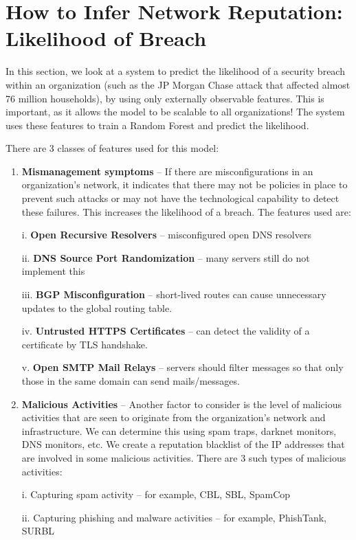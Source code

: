 \documentclass[11pt]{article}
\begin{document}
\section{How to Infer Network Reputation: Likelihood of Breach}
\label{sec:orgbd70231}

In this section, we look at a system to predict the likelihood of a security breach within an organization (such as the JP Morgan Chase attack that affected almost 76 million households), by using only externally observable features. This is important, as it allows the model to be scalable to all organizations! The system uses these features to train a Random Forest and predict the likelihood.

There are 3 classes of features used for this model:

\begin{enumerate}
\item \textbf{Mismanagement symptoms} – If there are misconfigurations in an organization’s network, it indicates that there may not be policies in place to prevent such attacks or may not have the technological capability to detect these failures. This increases the likelihood of a breach. The features used are:

i. \textbf{Open Recursive Resolvers} – misconfigured open DNS resolvers

ii. \textbf{DNS Source Port Randomization} – many servers still do not implement this

iii. \textbf{BGP Misconfiguration} – short-lived routes can cause unnecessary updates to the global routing table.

iv. \textbf{Untrusted HTTPS Certificates} – can detect the validity of a certificate by TLS handshake.

v. \textbf{Open SMTP Mail Relays} – servers should filter messages so that only those in the same domain can send mails/messages.

\item \textbf{Malicious Activities} – Another factor to consider is the level of malicious activities that are seen to originate from the organization’s network and infrastructure. We can determine this using spam traps, darknet monitors, DNS monitors, etc. We create a reputation blacklist of the IP addresses that are involved in some malicious activities. There are 3 such types of malicious activities:

i. Capturing spam activity – for example, CBL, SBL, SpamCop

ii. Capturing phishing and malware activities – for example, PhishTank, SURBL


\end{enumerate}
\end{document}
